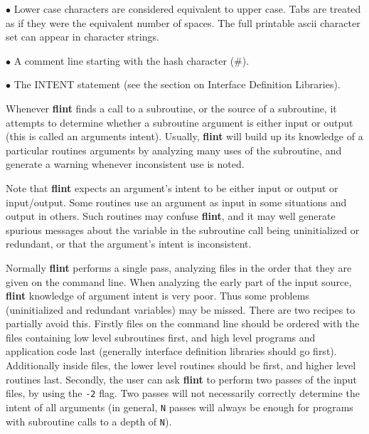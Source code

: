 \item{$\bullet$} Lower case characters are considered equivalent to upper
case. Tabs are treated as if they were the equivalent number of spaces.
The full printable ascii character set can appear in character strings.

\item{$\bullet$} A comment line starting with the hash character (\#).

\item{$\bullet$} The INTENT statement (see the section on Interface
Definition Libraries).


Whenever {\bf flint} finds a call to a subroutine, or the source of a
subroutine, it attempts to determine whether a subroutine argument is
either input or output (this is called an arguments intent). Usually,
{\bf flint} will build up its knowledge of a particular routines
arguments by analyzing many uses of the subroutine, and generate a
warning whenever inconsistent use is noted.

Note that {\bf flint} expects an argument's intent to be either input or
output or input/output. Some routines use an argument as input in some
situations and output in others. Such routines may confuse {\bf flint},
and it may well generate spurious messages about the variable in the
subroutine call being uninitialized or redundant, or that the argument's
intent is inconsistent.

Normally {\bf flint} performs a single pass, analyzing files in the order
that they are given on the command line. When analyzing the early part of
the input source, {\bf flint} knowledge of argument intent is very poor.
Thus some problems (uninitialized and redundant variables) may be missed.
There are two recipes to partially avoid this. Firstly files on the
command line should be ordered with the files containing low level
subroutines first, and high level programs and application code last
(generally interface definition libraries should go first). Additionally
inside files, the lower level routines should be first, and higher level
routines last. Secondly, the user can ask {\bf flint} to perform two
passes of the input files, by using the {\tt -2} flag.  Two passes will
not necessarily correctly determine the intent of all arguments (in
general, {\tt N} passes will always be enough for programs with subroutine
calls to a depth of {\tt N}).

